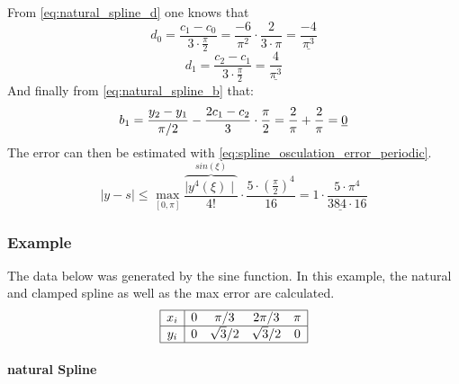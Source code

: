 From \autoref{eq:natural_spline_d} one knows that
$$
d_0=\frac{c_1-c_0}{3\cdot \frac{\pi}{2}}=\frac{-6}{\pi^2}\cdot \frac{2}{3\cdot \pi}=\underline{\frac{-4}{\pi^3}}
$$
$$
d_1=\frac{c_2-c_1}{3\cdot \frac{\pi}{2}}=\underline{\frac{4}{\pi^3}}
$$
And finally from \autoref{eq:natural_spline_b} that:
$$
b_1=\frac{y_2-y_1}{\pi/2}-\frac{2c_1-c_2}{3}\cdot \frac{\pi}{2}=\-\frac{2}{\pi}+\frac{2}{\pi}=\underline{0}
$$
The error can then be estimated with \autoref{eq:spline_osculation_error_periodic}.
$$
\mid y-s \mid \leq \max _{[0, \pi]} \frac{\overbrace{\mid y^4(\xi)\mid}^{sin(\xi)}}{4 !} \cdot \frac{5\cdot \left(\frac{\pi}{2}\right)^4}{16}=\underline{1\cdot \frac{5\cdot \pi^4}{384 \cdot 16}}
$$
\subsubsection{Example}\label{subsubsec:ex_spline}
The data below was generated by the sine function. In this example, the natural and clamped spline as well as the max error are calculated.
$$
\begin{array}{|c|cccc|}
\hline x_i & 0 & \pi / 3 & 2 \pi / 3 & \pi \\
\hline y_i & 0 & \sqrt{3} / 2 & \sqrt{3} / 2 & 0 \\
\hline
\end{array}
$$
\paragraph{natural Spline}

